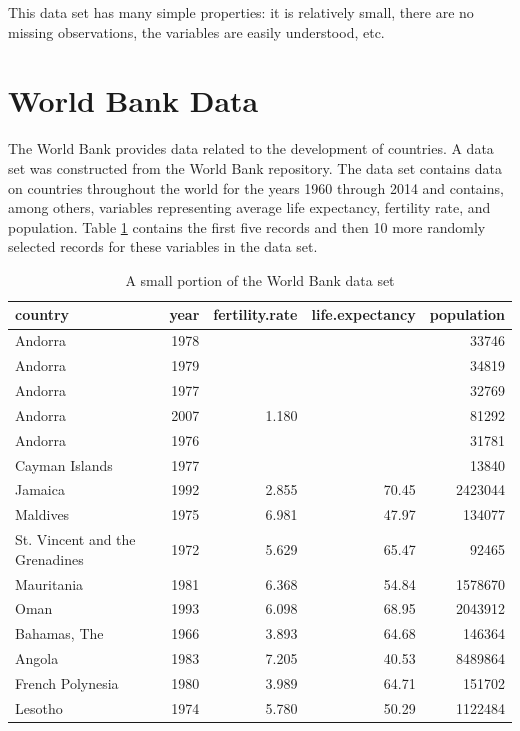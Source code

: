 \documentclass[]{krantz}
\begin{document}
This data set has many simple properties: it is relatively small, there are no missing observations, the variables are easily understood, etc.

\hypertarget{world-bank-data}{%
\section{World Bank Data}\label{world-bank-data}}

The World Bank provides data related to the development of countries. A data set was constructed from the World Bank repository. The data set contains data on countries throughout the world for the years 1960 through 2014 and contains, among others, variables representing average life expectancy, fertility rate, and population. Table \ref{tab:worldBank} contains the first five records and then 10 more randomly selected records for these variables in the data set.

\begin{table}[t]

\caption{\label{tab:worldBank}A small portion of the World Bank data set}
\centering
\begin{tabular}{lrrrr}
\toprule
country & year & fertility.rate & life.expectancy & population\\
\midrule
Andorra & 1978 &  &  & 33746\\
Andorra & 1979 &  &  & 34819\\
Andorra & 1977 &  &  & 32769\\
Andorra & 2007 & 1.180 &  & 81292\\
Andorra & 1976 &  &  & 31781\\
\addlinespace
Cayman Islands & 1977 &  &  & 13840\\
Jamaica & 1992 & 2.855 & 70.45 & 2423044\\
Maldives & 1975 & 6.981 & 47.97 & 134077\\
St. Vincent and the Grenadines & 1972 & 5.629 & 65.47 & 92465\\
Mauritania & 1981 & 6.368 & 54.84 & 1578670\\
\addlinespace
Oman & 1993 & 6.098 & 68.95 & 2043912\\
Bahamas, The & 1966 & 3.893 & 64.68 & 146364\\
Angola & 1983 & 7.205 & 40.53 & 8489864\\
French Polynesia & 1980 & 3.989 & 64.71 & 151702\\
Lesotho & 1974 & 5.780 & 50.29 & 1122484\\
\bottomrule
\end{tabular}
\end{table}
\end{document}
